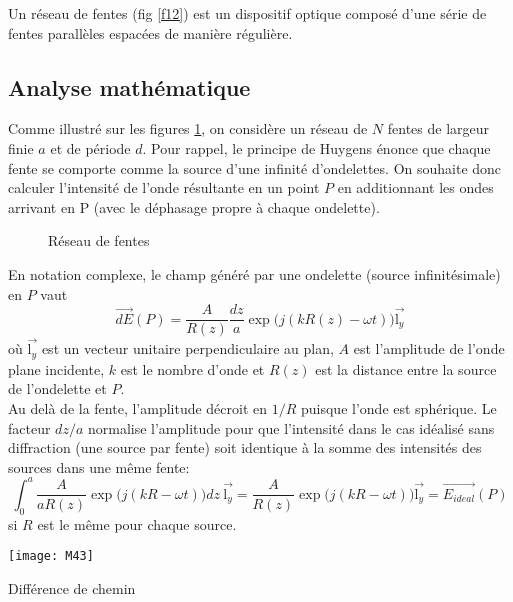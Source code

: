 Un réseau de fentes (fig \ref{f12}) est un dispositif optique composé d'une série de fentes parallèles espacées de manière régulière.

\subsection{Analyse mathématique}

Comme illustré sur les figures \ref{d10}, on considère un réseau de $N$ fentes de largeur finie $a$ et de période $d$. Pour rappel, le principe de Huygens énonce que chaque fente se comporte comme la source d'une infinité d'ondelettes. On souhaite donc calculer l'intensité de l'onde résultante en un point $P$ en additionnant les ondes arrivant en P (avec le déphasage propre à chaque ondelette).

\begin{figure}[h]
\centering
\subfloat[]{\texttt{[image: M41]}}
        \quad
\subfloat[]{\texttt{[image: M42]}}
\caption{Réseau de fentes}
        \label{d10}
\end{figure}

\noindent En notation complexe, le champ généré par une ondelette (source infinitésimale) en $P$ vaut
$$
 \overset\rightarrow{dE}(P)=\frac{A}{R(z)}\frac{dz}{a}\exp\big(j(kR(z)-\omega t)\big)\overset\rightarrow{\mbox{l}_y}
$$
où $\overset\rightarrow{\mbox{l}_y}$ est un vecteur unitaire perpendiculaire au plan, $A$ est l'amplitude de l'onde plane incidente, $k$ est le nombre d'onde et $R(z)$ est la distance entre la source de l'ondelette et $P$. \\
Au delà de la fente, l'amplitude décroit en $1/R$ puisque l'onde est sphérique. Le facteur $dz/a$ normalise l'amplitude pour que l'intensité dans le cas idéalisé sans diffraction (une source par fente) soit identique à la somme des intensités des sources dans une même fente:
$$
 \int_0^a\frac{A}{aR(z)}\exp\big(j(kR-\omega t)\big)dz\:\overset\rightarrow{\mbox{l}_y}=\frac{A}{R(z)}\exp\big(j(kR-\omega t)\big)\overset\rightarrow{\mbox{l}_y}=\overset\rightarrow{E_{ideal}}(P)
$$
si $R$ est le même pour chaque source.\\

\begin{marginfigure}[0cm]
\texttt{[image: M43]}
\caption{Différence de chemin}
\label{f14}
\end{marginfigure}

